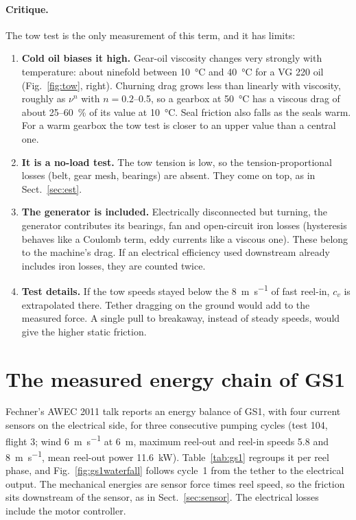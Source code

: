 \documentclass[11pt,a4paper]{article}
\begin{document}
\paragraph{Critique.} The tow test is the only measurement of this term, and it
has limits:
\begin{enumerate}
  \item \textbf{Cold oil biases it high.} Gear-oil viscosity changes very
    strongly with temperature: about ninefold between \SI{10}{\celsius} and
    \SI{40}{\celsius} for a VG 220 oil (Fig.~\ref{fig:tow}, right). Churning
    drag grows less than linearly with viscosity, roughly as $\nu^{n}$ with
    $n = 0.2$--0.5, so a gearbox at \SI{50}{\celsius} has a viscous drag of
    about 25--\SI{60}{\percent} of its value at \SI{10}{\celsius}. Seal
    friction also falls as the seals warm. For a warm gearbox the tow test
    is closer to an upper value than a central one.
  \item \textbf{It is a no-load test.} The tow tension is low, so the
    tension-proportional losses (belt, gear mesh, bearings) are absent. They
    come on top, as in Sect.~\ref{sec:est}.
  \item \textbf{The generator is included.} Electrically disconnected but
    turning, the generator contributes its bearings, fan and open-circuit iron
    losses (hysteresis behaves like a Coulomb term, eddy currents like a
    viscous one). These belong to the machine's drag. If an electrical
    efficiency used downstream already includes iron losses, they are counted
    twice.
  \item \textbf{Test details.} If the tow speeds stayed below the
    \SI{8}{m.s^{-1}} of fast reel-in, $c_v$ is extrapolated there. Tether
    dragging on the ground would add to the measured force. A single pull to
    breakaway, instead of steady speeds, would give the higher static
    friction.
\end{enumerate}

\section{The measured energy chain of GS1}
\label{sec:gs1}

Fechner's AWEC 2011 talk \cite{fechner2011} reports an energy balance of GS1,
with four current sensors on the electrical side, for three consecutive pumping
cycles (test 104, flight 3; wind \SI{6}{m.s^{-1}} at \SI{6}{m}, maximum reel-out
and reel-in speeds 5.8 and \SI{8}{m.s^{-1}}, mean reel-out power
\SI{11.6}{kW}). Table~\ref{tab:gs1} regroups it per reel phase, and
Fig.~\ref{fig:gs1waterfall} follows cycle~1 from the tether to the electrical
output. The mechanical energies are sensor force times reel speed, so the
friction sits downstream of the sensor, as in Sect.~\ref{sec:sensor}. The
electrical losses include the motor controller.
\end{document}
